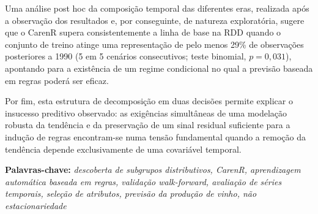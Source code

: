 Uma análise post hoc da composição temporal das diferentes eras, realizada após a observação dos resultados e, por conseguinte, de natureza exploratória, sugere que o CarenR supera consistentemente a linha de base na RDD quando o conjunto de treino atinge uma representação de pelo menos 29\% de observações posteriores a 1990 (5 em 5 cenários consecutivos; teste binomial, $p = 0{,}031$), apontando para a existência de um regime condicional no qual a previsão baseada em regras poderá ser eficaz.

Por fim, esta estrutura de decomposição em duas decisões permite explicar o insucesso preditivo observado: as exigências simultâneas de uma modelação robusta da tendência e da preservação de um sinal residual suficiente para a indução de regras encontram-se numa tensão fundamental quando a remoção da tendência depende exclusivamente de uma covariável temporal.

\textbf{Palavras-chave: }\textit{descoberta de subgrupos distributivos, CarenR, aprendizagem automática baseada em regras, validação walk-forward, avaliação de séries temporais, seleção de atributos, previsão da produção de vinho, não estacionariedade}
